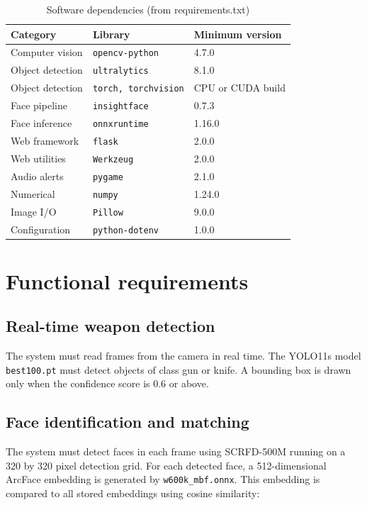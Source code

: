 \documentclass[12pt,a4paper]{report}
\begin{document}
\begin{table}[htbp]
\centering
\begin{tabular}{|l|l|l|}
\hline
\textbf{Category} & \textbf{Library} & \textbf{Minimum version} \\
\hline
Computer vision    & \texttt{opencv-python}      & 4.7.0 \\
Object detection   & \texttt{ultralytics}        & 8.1.0 \\
Object detection   & \texttt{torch, torchvision} & CPU or CUDA build \\
Face pipeline      & \texttt{insightface}        & 0.7.3 \\
Face inference     & \texttt{onnxruntime}        & 1.16.0 \\
Web framework      & \texttt{flask}              & 2.0.0 \\
Web utilities      & \texttt{Werkzeug}           & 2.0.0 \\
Audio alerts       & \texttt{pygame}             & 2.1.0 \\
Numerical          & \texttt{numpy}              & 1.24.0 \\
Image I/O          & \texttt{Pillow}             & 9.0.0 \\
Configuration      & \texttt{python-dotenv}      & 1.0.0 \\
\hline
\end{tabular}
\caption{Software dependencies (from requirements.txt)}
\label{tab:software_deps}
\end{table}

\section{Functional requirements}

\subsection{Real-time weapon detection}

The system must read frames from the camera in real time. The YOLO11s model \texttt{best100.pt} must detect objects of class gun or knife. A bounding box is drawn only when the confidence score is 0.6 or above.

\subsection{Face identification and matching}

The system must detect faces in each frame using SCRFD-500M running on a 320 by 320 pixel detection grid. For each detected face, a 512-dimensional ArcFace embedding is generated by \texttt{w600k\_mbf.onnx}. This embedding is compared to all stored embeddings using cosine similarity:
\end{document}
